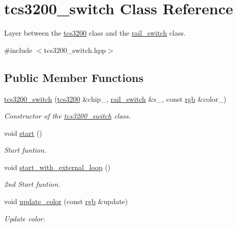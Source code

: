 \hypertarget{classtcs3200__switch}{}\section{tcs3200\+\_\+switch Class Reference}
\label{classtcs3200__switch}


Layer between the \hyperlink{classtcs3200}{tcs3200} class and the \hyperlink{classrail__switch}{rail\+\_\+switch} class.  




{\ttfamily \#include $<$tcs3200\+\_\+switch.\+hpp$>$}

\subsection*{Public Member Functions}
\begin{DoxyCompactItemize}
\item 
\hyperlink{classtcs3200__switch_a30625561212b744877df9c266c82dbc8}{tcs3200\+\_\+switch} (\hyperlink{classtcs3200}{tcs3200} \&chip\+\_\+, \hyperlink{classrail__switch}{rail\+\_\+switch} \&s\+\_\+, const \hyperlink{structrgb}{rgb} \&color\+\_\+)
\begin{DoxyCompactList}\small\item\em Constructor of the \hyperlink{classtcs3200__switch}{tcs3200\+\_\+switch} class. \end{DoxyCompactList}\item 
void \hyperlink{classtcs3200__switch_a5909fd81a1e61c10df8514825749625a}{start} ()
\begin{DoxyCompactList}\small\item\em Start funtion. \end{DoxyCompactList}\item 
void \hyperlink{classtcs3200__switch_a12fbbb7809c16d87fca8e92ef905e14b}{start\+\_\+with\+\_\+external\+\_\+loop} ()
\begin{DoxyCompactList}\small\item\em 2nd Start funtion. \end{DoxyCompactList}\item 
void \hyperlink{classtcs3200__switch_aaf7221f303cb22b5f3ac9ff749023abb}{update\+\_\+color} (const \hyperlink{structrgb}{rgb} \&update)
\begin{DoxyCompactList}\small\item\em Update color. \end{DoxyCompactList}\end{DoxyCompactItemize}
